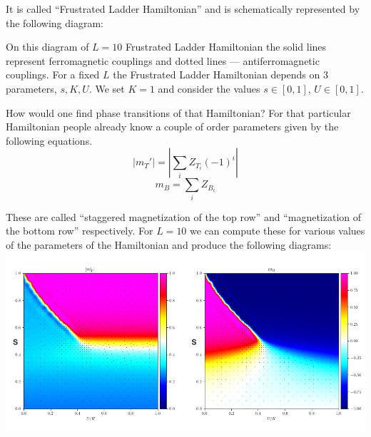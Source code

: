 \documentclass[
  american,aps,pra,reprint,floatfix,nofootinbib,superscriptaddress
]{revtex4-2}
\newcommand{\abs}[1]{\left|#1\right|}
\newcommand{\absmt}{\abs{m_{T}'}}
\begin{document}
It is called ``Frustrated Ladder Hamiltonian'' and is schematically represented
by the following diagram:
\begin{center}
  \pgfmathparse{\columnwidth/10.7cm}%
  \edef\tikzscale{\pgfmathresult}%
\end{center}
On this diagram of $L=10$ Frustrated Ladder Hamiltonian
the solid lines represent ferromagnetic couplings and
dotted lines --- antiferromagnetic couplings. For a fixed $L$
the Frustrated Ladder Hamiltonian depends on 3 parameters, $s, K, U$.
We set $K=1$ and consider the values $s\in[0,1]$, $U\in[0,1]$.

How would one find phase transitions of that Hamiltonian? For that particular
Hamiltonian people already know a couple of order parameters given by the
following equations.
\begin{equation}
  \label{eq:mt}
  \absmt = \abs{\sum_i Z_{T_i}(-1)^i}
\end{equation}
\begin{equation}
  \label{eq:mb}
  m_B = \sum_i Z_{B_i}
\end{equation}

These are called ``staggered magnetization of the top row'' and ``magnetization
of the bottom row'' respectively. For $L=10$ we can compute these for various
values of the parameters of the Hamiltonian and produce the following diagrams:
\includegraphics[width=\columnwidth]{lanczos_chi0_gp.png}
\end{document}

